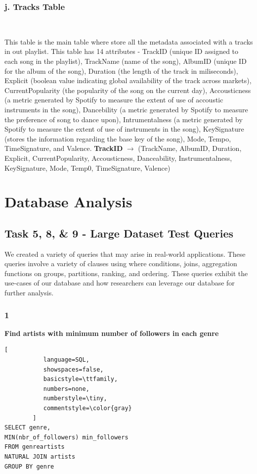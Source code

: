 \documentclass[conference]{IEEEtran}
\begin{document}
\subsubsection*{j. \textbf{Tracks} Table} \

This table is the main table where store all the metadata associated with a tracks in out playlist. This table has 14 attributes - TrackID (unique ID assigned to each song in the playlist), TrackName (name of the song), AlbumID (unique ID for the album of the song), Duration (the length of the track in miliseconds), Explicit (boolean value indicating global availability of the track across markets), CurrentPopularity (the popularity of the song on the current day), Accousticness (a metric generated by Spotify to measure the extent of use of accoustic instruments in the song), Dancebility (a metric generated by Spotify to measure the preference of song to dance upon), Intrumentalness (a metric generated by Spotify to measure the extent of use of instruments in the song), KeySignature (stores the information regarding the base key of the song), Mode, Tempo, TimeSignature, and Valence. \linebreak \linebreak
\textbf{TrackID} $\to$ (TrackName, AlbumID, Duration, Explicit, CurrentPopularity, Accousticness, Danceability, Instrumentalness, KeySignature, Mode, Temp0, TimeSignature, Valence)

\section{Database Analysis}

\subsection{\textbf{Task 5, 8, \& 9} - Large Dataset Test Queries}
We created a variety of queries that may arise in real-world applications. These queries involve a variety of clauses using where conditions, joins, aggregation functions on groups, partitions, ranking, and ordering. These queries exhibit the use-cases of our database and how researchers can leverage our database for further analysis. 

\subsubsection*{1} \textbf{Find artists with minimum number of followers in each genre}

\begin{lstlisting}[
           language=SQL,
           showspaces=false,
           basicstyle=\ttfamily,
           numbers=none,
           numberstyle=\tiny,
           commentstyle=\color{gray}
        ]
SELECT genre, 
MIN(nbr_of_followers) min_followers
FROM genreartists 
NATURAL JOIN artists 
GROUP BY genre
\end{lstlisting}
\end{document}
